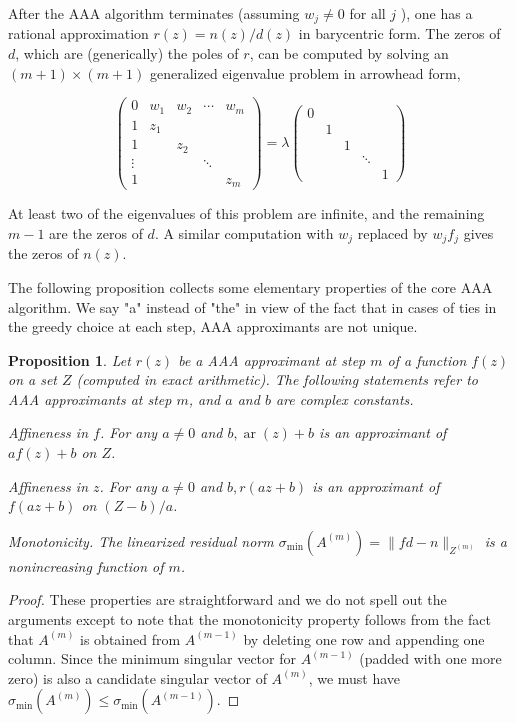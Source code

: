 \documentclass[11pt]{article}
\newtheorem{proposition}[theorem]{Proposition}
\theoremstyle{definition}
\begin{document}
After the AAA algorithm terminates (assuming $w_{j} \neq 0$ for all $j$ ), one has a rational approximation $r(z)=n(z) / d(z)$ in barycentric form. The zeros of $d$, which are (generically) the poles of $r$, can be computed by solving an $(m+1) \times(m+1)$
generalized eigenvalue problem in arrowhead form,

\[
\left(\begin{array}{ccccc}
0 & w_{1} & w_{2} & \cdots & w_{m}  \tag{3.11}\\
1 & z_{1} & & & \\
1 & & z_{2} & & \\
\vdots & & & \ddots & \\
1 & & & & z_{m}
\end{array}\right)=\lambda\left(\begin{array}{ccccc}
0 & & & & \\
& 1 & & & \\
& & 1 & & \\
& & & \ddots & \\
& & & & 1
\end{array}\right)
\]

At least two of the eigenvalues of this problem are infinite, and the remaining $m-1$ are the zeros of $d$. A similar computation with $w_{j}$ replaced by $w_{j} f_{j}$ gives the zeros of $n(z)$.

The following proposition collects some elementary properties of the core AAA algorithm. We say "a" instead of "the" in view of the fact that in cases of ties in the greedy choice at each step, AAA approximants are not unique.

\begin{proposition}
    Let $r(z)$ be a AAA approximant at step $m$ of a function $f(z)$ on a set $Z$ (computed in exact arithmetic). The following statements refer to AAA approximants at step $m$, and $a$ and $b$ are complex constants.

Affineness in $f$. For any $a \neq 0$ and $b, \operatorname{ar}(z)+b$ is an approximant of $a f(z)+b$ on $Z$.

Affineness in $z$. For any $a \neq 0$ and $b, r(a z+b)$ is an approximant of $f(a z+b)$ on $(Z-b) / a$.

Monotonicity. The linearized residual norm $\sigma_{\min }\left(A^{(m)}\right)=\|f d-n\|_{Z^{(m)}}$ is a nonincreasing function of $m$.
\end{proposition}

\begin{proof}
    These properties are straightforward and we do not spell out the arguments except to note that the monotonicity property follows from the fact that $A^{(m)}$ is obtained from $A^{(m-1)}$ by deleting one row and appending one column. Since the minimum singular vector for $A^{(m-1)}$ (padded with one more zero) is also a candidate singular vector of $A^{(m)}$, we must have $\sigma_{\min }\left(A^{(m)}\right) \leq \sigma_{\min }\left(A^{(m-1)}\right)$.
\end{proof}
\end{document}
